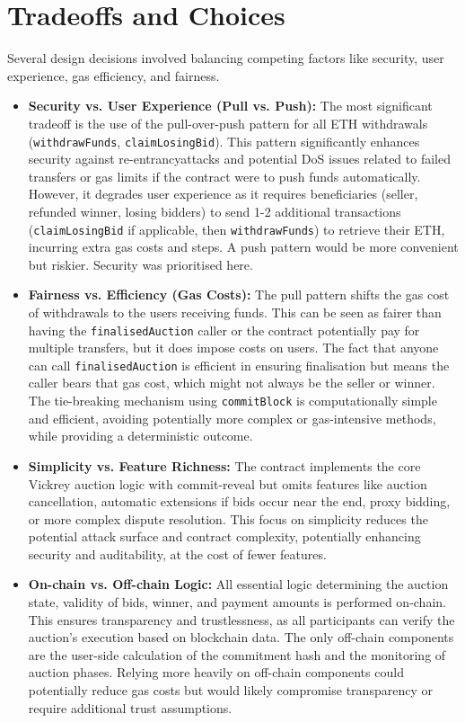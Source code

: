 \documentclass[11pt, a4paper]{article}
\begin{document}
\section{Tradeoffs and Choices}
Several design decisions involved balancing competing factors like security, user experience, gas efficiency, and fairness.
\begin{itemize}
    \item \textbf{Security vs. User Experience (Pull vs. Push):} The most significant tradeoff is the use of the pull-over-push pattern for all ETH withdrawals (\texttt{withdrawFunds}, \texttt{claimLosingBid}). This pattern significantly enhances security against re-entrancy\newline attacks and potential DoS issues related to failed transfers or gas limits if the contract were to push funds automatically. However, it degrades user experience as it requires beneficiaries (seller, refunded winner, losing bidders) to send 1-2 additional transactions (\texttt{claimLosingBid} if applicable, then \texttt{withdrawFunds}) to retrieve their ETH, incurring extra gas costs and steps. A push pattern would be more convenient but riskier. Security was prioritised here.
    \item \textbf{Fairness vs. Efficiency (Gas Costs):} The pull pattern shifts the gas cost of withdrawals to the users receiving funds. This can be seen as fairer than having the \newline \texttt{finalisedAuction} caller or the contract potentially pay for multiple transfers, but it does impose costs on users. The fact that anyone can call \texttt{finalisedAuction} is efficient in ensuring finalisation but means the caller bears that gas cost, which might not always be the seller or winner. The tie-breaking mechanism using \texttt{commitBlock} is computationally simple and efficient, avoiding potentially more complex or gas-intensive methods, while providing a deterministic outcome.
    \item \textbf{Simplicity vs. Feature Richness:} The contract implements the core Vickrey auction logic with commit-reveal but omits features like auction cancellation, automatic extensions if bids occur near the end, proxy bidding, or more complex dispute resolution. This focus on simplicity reduces the potential attack surface and contract complexity, potentially enhancing security and auditability, at the cost of fewer features.
    \item \textbf{On-chain vs. Off-chain Logic:} All essential logic determining the auction state, validity of bids, winner, and payment amounts is performed on-chain. This ensures transparency and trustlessness, as all participants can verify the auction's execution based on blockchain data. The only off-chain components are the user-side calculation of the commitment hash and the monitoring of auction phases. Relying more heavily on off-chain components could potentially reduce gas costs but would likely compromise transparency or require additional trust assumptions.
\end{itemize}
\end{document}
